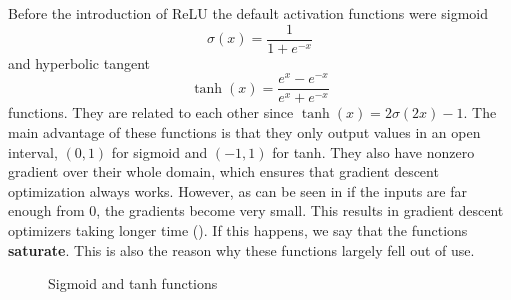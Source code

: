 Before the introduction of ReLU the default activation functions were sigmoid $$\sigma(x)=\frac{1}{1+e^{-x}}$$ and hyperbolic tangent $$\tanh(x)=\frac{e^x-e^{-x}}{e^x+e^{-x}}$$ functions. They are related to each other since $\tanh(x)=2\sigma(2x)-1$. The main advantage of these functions is that they only output values in an open interval, $(0,1)$ for sigmoid and $(-1,1)$ for tanh. They also have nonzero gradient over their whole domain, which ensures that gradient descent optimization always works. However, as can be seen in  if the inputs are far enough from $0$, the gradients become very small. This results in gradient descent optimizers taking longer time (\cite{imagenet_relu}). If this happens, we say that the functions \textbf{saturate}. This is also the reason why these functions largely fell out of use.
\begin{figure}[t]
\caption{Sigmoid and tanh functions}
\center
\label{sigmoiddiagram}
\end{figure}

